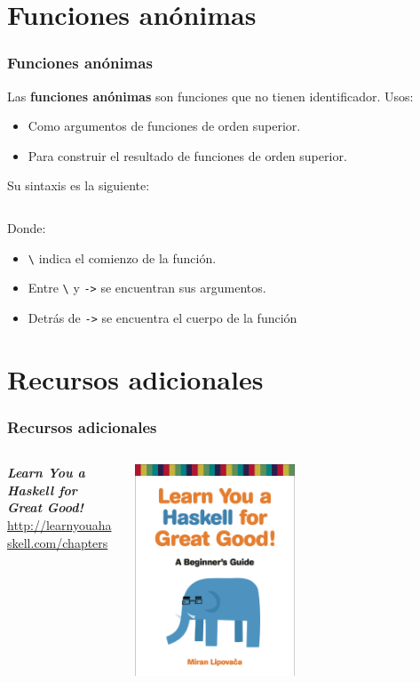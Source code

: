 \section{Funciones anónimas}
\begin{frame}
  \frametitle{Funciones anónimas}
  Las \textbf{funciones anónimas} son funciones que no tienen identificador. Usos:
  \begin{itemize}
  \item Como argumentos de funciones de orden superior.
  \item Para construir el resultado de funciones de orden superior.
  \end{itemize}
  Su sintaxis es la siguiente:
  \inputminted[bgcolor=bg]{haskell}{code/anon.hs}
  Donde:
  \begin{itemize}
  \item \texttt{\textbackslash} indica el comienzo de la función.
  \item Entre \texttt{\textbackslash} y \texttt{->} se encuentran sus argumentos.
  \item Detrás de \texttt{->} se encuentra el cuerpo de la función
  \end{itemize}
\end{frame}

\section{Recursos adicionales}
\begin{frame}
  \frametitle{Recursos adicionales}
  \begin{columns}
    \begin{column}{0.5\textwidth}
      \textbf{\textit{Learn You a Haskell for Great Good!}}\\
      \url{http://learnyouahaskell.com/chapters}
    \end{column}
    \begin{column}{0.5\textwidth}  %
      \begin{center}
        \includegraphics[width=0.5\textwidth]{img/LYH.png}
      \end{center}
    \end{column}
  \end{columns}
\end{frame}
